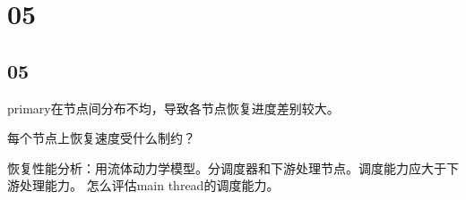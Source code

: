 \section{05}

\subsection{05}

primary在节点间分布不均，导致各节点恢复进度差别较大。

每个节点上恢复速度受什么制约？

恢复性能分析：用流体动力学模型。分调度器和下游处理节点。调度能力应大于下游处理能力。
怎么评估main thread的调度能力。

